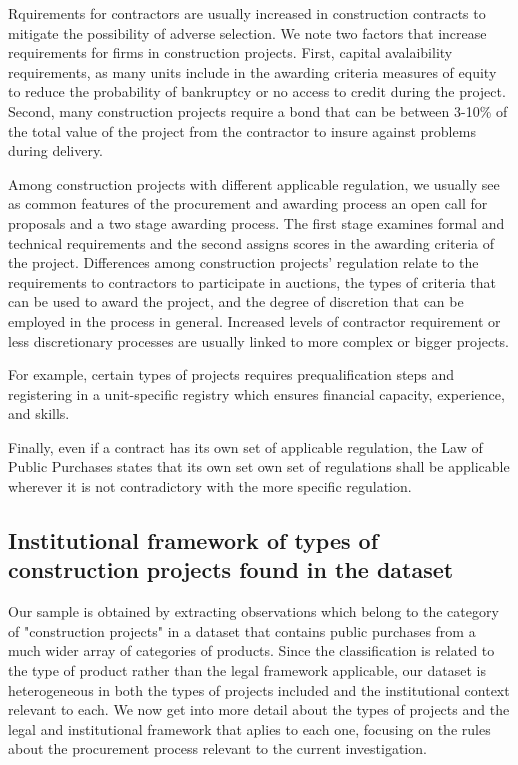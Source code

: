 Rquirements for contractors are usually increased in construction contracts to mitigate the possibility of adverse selection. We note two factors that increase requirements for firms in construction projects. First, capital avalaibility requirements, as many units include in the awarding criteria measures of equity to reduce the probability of bankruptcy or no access to credit during the project. Second, many construction projects require a bond that can be between 3-10\% of the total value of the project from the contractor to insure against problems during delivery.

Among construction projects with different applicable regulation, we usually see as common features of the procurement and awarding process an open call for proposals and a two stage awarding process. The first stage examines formal and technical requirements and the second assigns scores in the awarding criteria of the project. Differences among construction projects' regulation relate to the requirements to contractors to participate in auctions, the types of criteria that can be used to award the project, and the degree of discretion that can be employed in the process in general. Increased levels of contractor requirement or less discretionary processes are usually linked to more complex or bigger projects.

For example, certain types of projects requires prequalification steps and registering in a unit-specific registry which ensures financial capacity, experience, and skills.

Finally, even if a contract has its own set of applicable regulation, the Law of Public Purchases states that its own set own set of regulations shall be applicable wherever it is not contradictory with the more specific regulation.


\subsection{Institutional framework of types of construction projects found in the dataset}
Our sample is obtained by extracting observations which belong to the category of "construction projects" in a dataset that contains public purchases from a much wider array of categories of products. Since the classification is related to the type of product rather than the legal framework applicable, our dataset is heterogeneous in both the types of projects included and the institutional context relevant to each. We now get into more detail about the types of projects and the legal and institutional framework that aplies to each one, focusing on the rules about the procurement process relevant to the current investigation.

